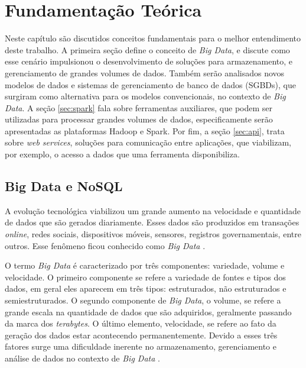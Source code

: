 
\chapter{Fundamentação Teórica}
\label{chap:fundamentacaoTeorica}

Neste capítulo são discutidos conceitos fundamentais para o melhor entendimento deste 
trabalho. A primeira seção define o conceito de \textit{Big Data}, e discute como esse 
cenário impulsionou o desenvolvimento de soluções para armazenamento, e gerenciamento de 
grandes volumes de dados. Também serão analisados novos modelos de dados e sistemas de 
gerenciamento de banco de dados (SGBDs), que surgiram como alternativa para os modelos 
convencionais, no contexto de \textit{Big Data}. A seção \ref{sec:spark} fala 
sobre ferramentas auxiliares, que podem ser utilizadas para processar grandes volumes de dados,
especificamente serão apresentadas as plataformas Hadoop e Spark. Por fim, a seção 
\ref{sec:api}, trata sobre \textit{web services}, soluções para comunicação entre aplicações, 
que viabilizam, por exemplo, o acesso a dados que uma ferramenta disponibiliza.

\section{Big Data e NoSQL}
\label{sec:bigdata}

A evolução tecnológica viabilizou um grande aumento na velocidade e quantidade de dados que 
são gerados diariamente. Esses dados são produzidos em transações \textit{online}, redes sociais, 
dispositivos móveis, sensores, registros governamentais, entre outros. Esse fenômeno ficou 
conhecido como \textit{Big Data} \cite{sagiroglu2013big}. 

O termo \textit{Big Data} é caracterizado por três componentes: variedade, volume e velocidade. 
O primeiro componente se refere a variedade de fontes e tipos dos dados, em geral eles 
aparecem em três tipos: estruturados, não estruturados e semiestruturados. O segundo componente 
de \textit{Big Data}, o volume, se refere a grande escala na quantidade de dados que são 
adquiridos, geralmente passando da marca dos \textit{terabytes}. O último elemento, 
velocidade, se refere ao fato da geração dos dados estar acontecendo permanentemente. Devido 
a esses três fatores surge uma dificuldade inerente no armazenamento, gerenciamento e 
análise de dados no contexto de \textit{Big Data} \cite{sagiroglu2013big}.

